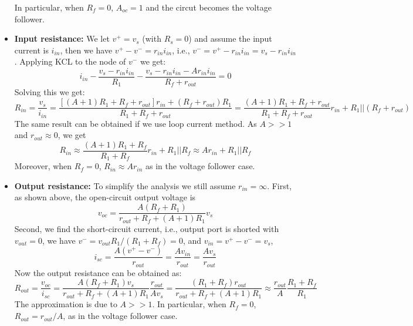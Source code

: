 \begin{itemize}
      In particular, when $R_f=0$, $A_{oc}=1$ and the circut becomes the voltage
      follower.

    \item {\bf Input resistance:} We let $v^+=v_s$ (with $R_s=0$) and assume
      the input current is $i_{in}$, then we have $v^+-v^-=r_{in}i_{in}$, i.e.,
      $v^-=v^+-r_{in}i_{in}=v_s-r_{in}i_{in}$. Applying KCL to the node of $v^-$ 
      we get:
      \[ i_{in}-\frac{v_s-r_{in}i_{in}}{R_1}-\frac{v_s-r_{in}i_{in}-A r_{in}i_{in}}{R_f+r_{out}}=0 \]
      Solving this we get:
      \[ R_{in}=\frac{v_s}{i_{in}}
      =\frac{[(A+1)R_1+R_f+r_{out}]r_{in}+(R_f+r_{out})R_1}{R_1+R_f+r_{out}}
      =\frac{(A+1)R_1+R_f+r_{out}}{R_1+R_f+r_{out}}r_{in}+R_1||(R_f+r_{out}) \]
      The same result can be obtained if we use loop current method.
      As $A>>1$ and $r_{out} \approx 0$, we get
      \[ R_{in}  \approx \frac{(A+1)R_1+R_f}{R_1+R_f}r_{in}+R_1||R_f
      \approx A r_{in}+R_1||R_f \]
      Moreover, when $R_f=0$, $R_{in}\approx A r_{in}$ as in the voltage follower case.

    \item {\bf Output resistance:} 
      To simplify the analysis we still assume $r_{in}=\infty$. First, as shown above, 
      the open-circuit output voltage is 
      \[ v_{oc}=\frac{A(R_f+R_1)}{r_{out}+R_f+(A+1)R_1}v_s \]
      Second, we find the short-circuit current, i.e., output port is shorted with
      $v_{out}=0$, we have $v^-=v_{out}R_1/(R_1+R_f)=0$, and $v_{in}=v^+-v^-=v_s$,
      \[ i_{sc}=\frac{A(v^+-v^-)}{r_{out}}=\frac{Av_{in}}{r_{out}}
      =\frac{Av_s}{r_{out}} \]
      Now the output resistance can be obtained as:
      \[ R_{out}=\frac{v_{oc}}{i_{sc}}=\frac{A(R_f+R_1)v_s}{r_{out}+R_f+(A+1)R_1} 
      \frac{r_{out}}{Av_s}=\frac{(R_1+R_f)r_{out}}{r_{out}+R_f+(A+1)R_1}
      \approx \frac{r_{out}}{A} \frac{R_1+R_f}{R_1} \]
      The approximation is due to $A>>1$. In particular, when $R_f=0$, 
      $R_{out}=r_{out}/A$, as in the voltage follower case.

  \end{itemize}



